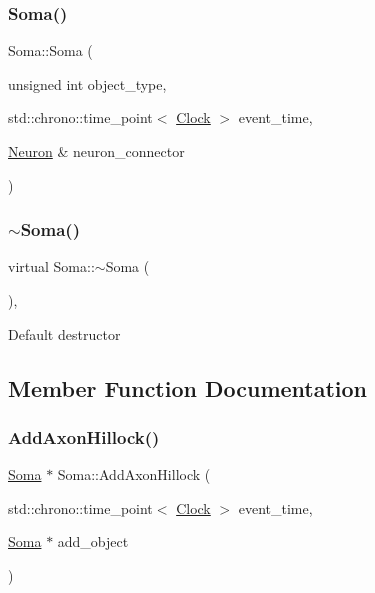 \subsubsection{\texorpdfstring{Soma()}{Soma()}\hspace{0.1cm}{\footnotesize\ttfamily [4/4]}}
{\footnotesize\ttfamily Soma\+::\+Soma (\begin{DoxyParamCaption}\item[{unsigned int}]{object\+\_\+type,  }\item[{std\+::chrono\+::time\+\_\+point$<$ \mbox{\hyperlink{universe_8h_a0ef8d951d1ca5ab3cfaf7ab4c7a6fd80}{Clock}} $>$}]{event\+\_\+time,  }\item[{\mbox{\hyperlink{classNeuron}{Neuron}} \&}]{neuron\+\_\+connector }\end{DoxyParamCaption})\hspace{0.3cm}{\ttfamily [inline]}}

\mbox{\label{classSoma_a482570e6b3e366db93396add6ba1922d}} 
\subsubsection{\texorpdfstring{$\sim$\+Soma()}{~Soma()}}
{\footnotesize\ttfamily virtual Soma\+::$\sim$\+Soma (\begin{DoxyParamCaption}{ }\end{DoxyParamCaption})\hspace{0.3cm}{\ttfamily [inline]}, {\ttfamily [virtual]}}

Default destructor 

\subsection{Member Function Documentation}
\mbox{\label{classSoma_a02e0e4656099531b35ab56ad1f7c945a}} 
\subsubsection{\texorpdfstring{Add\+Axon\+Hillock()}{AddAxonHillock()}}
{\footnotesize\ttfamily \mbox{\hyperlink{classSoma}{Soma}} $\ast$ Soma\+::\+Add\+Axon\+Hillock (\begin{DoxyParamCaption}\item[{std\+::chrono\+::time\+\_\+point$<$ \mbox{\hyperlink{universe_8h_a0ef8d951d1ca5ab3cfaf7ab4c7a6fd80}{Clock}} $>$}]{event\+\_\+time,  }\item[{\mbox{\hyperlink{classSoma}{Soma}} $\ast$}]{add\+\_\+object }\end{DoxyParamCaption})}

